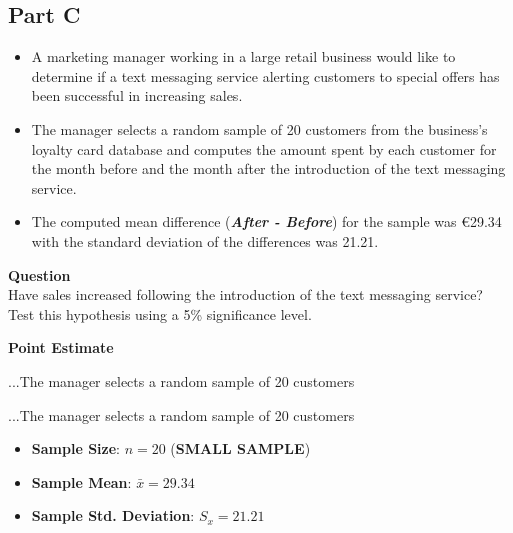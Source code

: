\documentclass[]{article}
\begin{document}
\subsection*{Part C} 
\begin{itemize}
\item A marketing manager working in a large retail business would like to determine if a text messaging service alerting customers to special offers has been successful in increasing sales. 
\item The manager selects a random sample of 20 customers from the business’s loyalty card database and computes the amount spent by each customer for the month before and the month after the introduction of the text messaging service. 
\item The computed mean difference (\textbf{\textit{After - Before}}) for the sample was €29.34 with the standard deviation of the differences was 21.21.
\end{itemize}
\noindent \textbf{Question}\\
Have sales increased following the introduction of the text messaging service? Test this hypothesis using a 5\% significance level.

\newpage

\noindent \textbf{Point Estimate}
\begin{framed}
	\noindent ...The manager selects a random sample of 20 customers
\end{framed}
\begin{framed}
	\noindent ...The manager selects a random sample of 20 customers
\end{framed}
{
	\LARGE \begin{itemize}
		\item \textbf{Sample Size}: $n=20$ (\textbf{SMALL SAMPLE})
		\item \textbf{Sample Mean}: $\bar{x}=29.34$
		\item \textbf{Sample Std. Deviation}: $S_{x}=21.21$
	\end{itemize}
}
\end{document}
